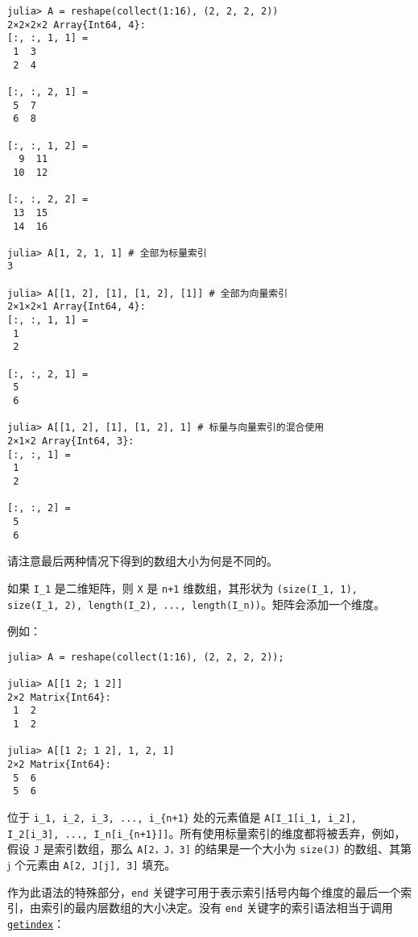 \begin{verbatim}
julia> A = reshape(collect(1:16), (2, 2, 2, 2))
2×2×2×2 Array{Int64, 4}:
[:, :, 1, 1] =
 1  3
 2  4

[:, :, 2, 1] =
 5  7
 6  8

[:, :, 1, 2] =
  9  11
 10  12

[:, :, 2, 2] =
 13  15
 14  16

julia> A[1, 2, 1, 1] # 全部为标量索引
3

julia> A[[1, 2], [1], [1, 2], [1]] # 全部为向量索引
2×1×2×1 Array{Int64, 4}:
[:, :, 1, 1] =
 1
 2

[:, :, 2, 1] =
 5
 6

julia> A[[1, 2], [1], [1, 2], 1] # 标量与向量索引的混合使用
2×1×2 Array{Int64, 3}:
[:, :, 1] =
 1
 2

[:, :, 2] =
 5
 6
\end{verbatim}



请注意最后两种情况下得到的数组大小为何是不同的。



如果 \texttt{I\_1} 是二维矩阵，则 \texttt{X} 是 \texttt{n+1} 维数组，其形状为 \texttt{(size(I\_1, 1), size(I\_1, 2), length(I\_2), ..., length(I\_n))}。矩阵会添加一个维度。



例如：




\begin{verbatim}
julia> A = reshape(collect(1:16), (2, 2, 2, 2));

julia> A[[1 2; 1 2]]
2×2 Matrix{Int64}:
 1  2
 1  2

julia> A[[1 2; 1 2], 1, 2, 1]
2×2 Matrix{Int64}:
 5  6
 5  6
\end{verbatim}



位于 \texttt{i\_1, i\_2, i\_3, ..., i\_\{n+1\}} 处的元素值是 \texttt{A[I\_1[i\_1, i\_2], I\_2[i\_3], ..., I\_n[i\_\{n+1\}]]}。所有使用标量索引的维度都将被丢弃，例如，假设 \texttt{J} 是索引数组，那么 \texttt{A[2，J，3]} 的结果是一个大小为 \texttt{size(J)} 的数组、其第 j 个元素由 \texttt{A[2, J[j], 3]} 填充。



作为此语法的特殊部分，\texttt{end} 关键字可用于表示索引括号内每个维度的最后一个索引，由索引的最内层数组的大小决定。没有 \texttt{end} 关键字的索引语法相当于调用\hyperlink{13720608614876840481}{\texttt{getindex}}：




